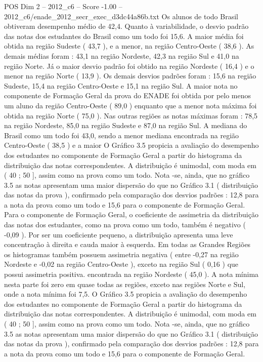 \begin{textsample}{POS Dim 2 – 2012\_c6 – Score -1.00 – 2012\_c6/enade\_2012\_secr\_exec\_d3dc44a86b.txt}
Os alunos de todo Brasil obtiveram desempenho médio de 42,4.
Quanto à variabilidade, o desvio padrão das notas dos estudantes do Brasil como um todo foi 15,6.
A maior média foi obtida na região Sudeste ( 43,7 ), e a menor, na região Centro-Oeste ( 38,6 ).
As demais médias foram : 43,1 na região Nordeste, 42,3 na região Sul e 41,0 na região Norte.
Já o maior desvio padrão foi obtido na região Nordeste ( 16,4 ) e o menor na região Norte ( 13,9 ).
Os demais desvios padrões foram : 15,6 na região Sudeste, 15,4 na região Centro-Oeste e 15,1 na região Sul.
A maior nota no componente de Formação Geral da prova do ENADE foi obtida por pelo menos um aluno da região Centro-Oeste ( 89,0 ) enquanto que a menor nota máxima foi obtida na região Norte ( 75,0 ).
Nas outras regiões as notas máximas foram : 78,5 na região Nordeste, 85,0 na região Sudeste e 87,0 na região Sul.
A mediana do Brasil como um todo foi 43,0, sendo a menor mediana encontrada na região Centro-Oeste ( 38,5 ) e a maior O Gráfico 3.5 propicia a avaliação do desempenho dos estudantes no componente de Formação Geral a partir do histograma da distribuição das notas correspondentes.
A distribuição é unimodal, com moda em ( 40 ; 50 ], assim como na prova como um todo.
Nota -se, ainda, que no gráfico 3.5 as notas apresentam uma maior dispersão do que no Gráfico 3.1 ( distribuição das notas da prova ), confirmado pela comparação dos desvios padrões : 12,8 para a nota da prova como um todo e 15,6 para o componente de Formação Geral.
Para o componente de Formação Geral, o coeficiente de assimetria da distribuição das notas dos estudantes, como na prova como um todo, também é negativo ( -0,09 ).
Por ser um coeficiente pequeno, a distribuição apresenta uma leve concentração à direita e cauda maior à esquerda.
Em todas as Grandes Regiões os histogramas também possuem assimetria negativa ( entre -0,27 na região Nordeste e -0,02 na região Centro-Oeste ), exceto na região Sul ( 0,16 ) que possui assimetria positiva. encontrada na região Nordeste ( 45,0 ).
A nota mínima nesta parte foi zero em quase todas as regiões, exceto nas regiões Norte e Sul, onde a nota mínima foi 7,5.
O Gráfico 3.5 propicia a avaliação do desempenho dos estudantes no componente de Formação Geral a partir do histograma da distribuição das notas correspondentes.
A distribuição é unimodal, com moda em ( 40 ; 50 ], assim como na prova como um todo.
Nota -se, ainda, que no gráfico 3.5 as notas apresentam uma maior dispersão do que no Gráfico 3.1 ( distribuição das notas da prova ), confirmado pela comparação dos desvios padrões : 12,8 para a nota da prova como um todo e 15,6 para o componente de Formação Geral.

\end{textsample}
